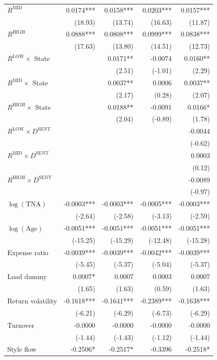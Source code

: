 \begin{table}[!htbp]
{\begin{tabular*}{\linewidth}{@{\extracolsep{\fill}}lrrrr}
$R^{\text{MID}}$ & 0.0174*** & 0.0158*** & 0.0203*** & 0.0157***\\
 & (18.93) & (13.74) & (16.63) & (11.87)\\
$R^{\text{HIGH}}$ & 0.0888*** & 0.0808*** & 0.0999*** & 0.0838***\\
 & (17.63) & (13.80) & (14.51) & (12.73)\\
$R^{\text{LOW}}\times$ State &  & 0.0171** & -0.0074 & 0.0160**\\
 &  & (2.51) & (-1.01) & (2.29)\\
$R^{\text{MID}}\times$ State &  & 0.0037** & 0.0006 & 0.0037**\\
 &  & (2.17) & (0.28) & (2.07)\\
$R^{\text{HIGH}}\times$ State &  & 0.0188** & -0.0091 & 0.0166*\\
 &  & (2.04) & (-0.89) & (1.78)\\
$R^{\text{LOW}}\times D^{\text{SENT}}$ &  &  &  & -0.0044\\
 &  &  &  & (-0.62)\\
$R^{\text{MID}}\times D^{\text{SENT}}$ &  &  &  & 0.0003\\
 &  &  &  & (0.12)\\
$R^{\text{HIGH}}\times D^{\text{SENT}}$ &  &  &  & -0.0089\\
 &  &  &  & (-0.97)\\
$\log(\text{TNA})$ & -0.0003*** & -0.0003*** & -0.0005*** & -0.0003***\\
 & (-2.64) & (-2.58) & (-3.13) & (-2.59)\\
$\log(\text{Age})$ & -0.0051*** & -0.0051*** & -0.0051*** & -0.0051***\\
 & (-15.25) & (-15.29) & (-12.48) & (-15.28)\\
Expense ratio & -0.0039*** & -0.0039*** & -0.0042*** & -0.0039***\\
 & (-5.45) & (-5.37) & (-5.04) & (-5.37)\\
Load dummy & 0.0007* & 0.0007 & 0.0003 & 0.0007\\
 & (1.65) & (1.63) & (0.59) & (1.63)\\
Return volatility & -0.1618*** & -0.1641*** & -0.2389*** & -0.1638***\\
 & (-6.21) & (-6.29) & (-6.73) & (-6.29)\\
Turnover & -0.0000 & -0.0000 & -0.0000 & -0.0000\\
 & (-1.44) & (-1.43) & (-1.12) & (-1.44)\\
Style flow & -0.2506* & -0.2517* & -0.3396 & -0.2518*\\

\end{tabular*}}
\end{table}

